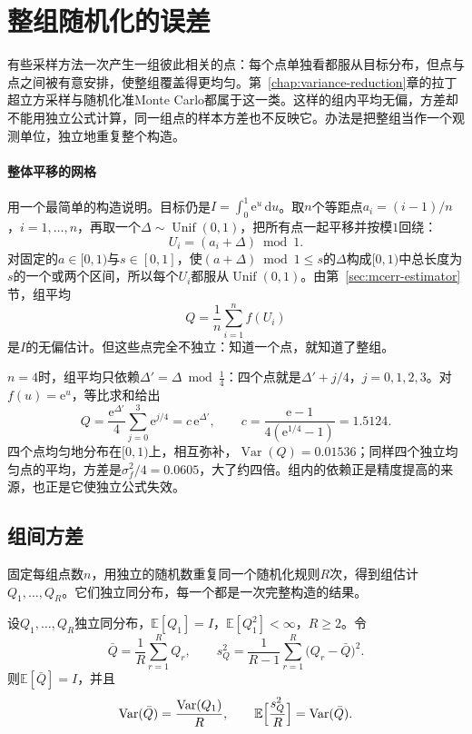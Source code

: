 \section{整组随机化的误差}
\label{sec:mcerr-replication}

有些采样方法一次产生一组彼此相关的点：每个点单独看都服从目标分布，但点与点之间被有意安排，使整组覆盖得更均匀。第~\ref{chap:variance-reduction}章的拉丁超立方采样与随机化准Monte Carlo都属于这一类。这样的组内平均无偏，方差却不能用独立公式计算，同一组点的样本方差也不反映它。办法是把整组当作一个观测单位，独立地重复整个构造。

\paragraph{整体平移的网格}
用一个最简单的构造说明。目标仍是$I=\int_0^1\mathrm{e}^{u}\,\mathrm{d}u$。取$n$个等距点$a_i=(i-1)/n$，$i=1,\dots,n$，再取一个$\Delta\sim\operatorname{Unif}(0,1)$，把所有点一起平移并按模$1$回绕：
\[
 U_i=(a_i+\Delta)\bmod1 .
\]
对固定的$a\in[0,1)$与$s\in[0,1]$，使$(a+\Delta)\bmod1\leq s$的$\Delta$构成$[0,1)$中总长度为$s$的一个或两个区间，所以每个$U_i$都服从$\operatorname{Unif}(0,1)$。由第~\ref{sec:mcerr-estimator}节，组平均
\[
 Q=\frac1n\sum_{i=1}^{n}f(U_i)
\]
是$I$的无偏估计。但这些点完全不独立：知道一个点，就知道了整组。

$n=4$时，组平均只依赖$\Delta'=\Delta\bmod\tfrac14$：四个点就是$\Delta'+j/4$，$j=0,1,2,3$。对$f(u)=\mathrm{e}^{u}$，等比求和给出
\begin{equation}
 Q=\frac{\mathrm{e}^{\Delta'}}{4}\sum_{j=0}^{3}\mathrm{e}^{j/4}=c\,\mathrm{e}^{\Delta'},\qquad c=\frac{\mathrm{e}-1}{4(\mathrm{e}^{1/4}-1)}=1.5124 .
 \label{eq:mcerr-shift-q}
\end{equation}
四个点均匀地分布在$[0,1)$上，相互弥补，$\operatorname{Var}(Q)=0.01536$；同样四个独立均匀点的平均，方差是$\sigma_f^{2}/4=0.0605$，大了约四倍。组内的依赖正是精度提高的来源，也正是它使独立公式失效。

\subsection{组间方差}
\label{sec:mcerr-between-var}

固定每组点数$n$，用独立的随机数重复同一个随机化规则$R$次，得到组估计$Q_1,\dots,Q_R$。它们独立同分布，每一个都是一次完整构造的结果。

\begin{theorem}[组间方差估计]
\label{thm:mcerr-between-var}
设$Q_1,\dots,Q_R$独立同分布，$\mathbb{E}[Q_1]=I$，$\mathbb{E}[Q_1^{2}]<\infty$，$R\geq2$。令
\begin{equation}
 \bar{Q}=\frac1R\sum_{r=1}^{R}Q_r,\qquad s_Q^{2}=\frac{1}{R-1}\sum_{r=1}^{R}\bigl(Q_r-\bar{Q}\bigr)^{2} .
 \label{eq:mcerr-between}
\end{equation}
则$\mathbb{E}[\bar{Q}]=I$，并且
\begin{equation}
 \operatorname{Var}(\bar{Q})=\frac{\operatorname{Var}(Q_1)}{R},\qquad \mathbb{E}\Bigl[\frac{s_Q^{2}}{R}\Bigr]=\operatorname{Var}(\bar{Q}) .
 \label{eq:mcerr-between-unbiased}
\end{equation}
\end{theorem}

